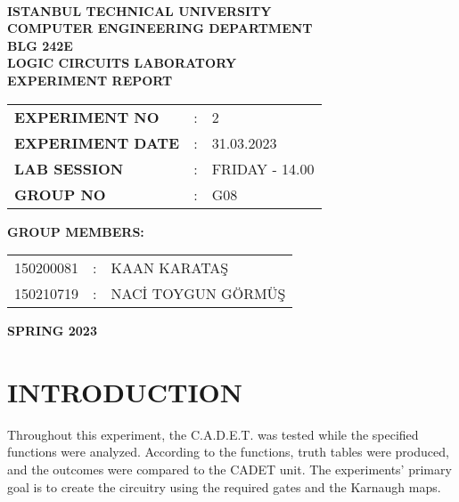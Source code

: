 \documentclass[pdftex,12pt,a4paper]{article}
\begin{document}
\begin{titlepage}
\begin{center}
\textbf{}\\
\textbf{\Large{ISTANBUL TECHNICAL UNIVERSITY}}\\
\vspace{0.5cm}
\textbf{\Large{COMPUTER ENGINEERING DEPARTMENT}}\\
\vspace{2cm}
\textbf{\Large{BLG 242E\\ LOGIC CIRCUITS LABORATORY\\ EXPERIMENT REPORT}}\\
\vspace{2.8cm}
\begin{table}[ht]
\centering
\Large{
\begin{tabular}{lcl}
\textbf{EXPERIMENT NO}  & : & 2 \\
\textbf{EXPERIMENT DATE}  & : & 31.03.2023 \\
\textbf{LAB SESSION}  & : & FRIDAY - 14.00 \\
\textbf{GROUP NO}  & : & G08 \\
\end{tabular}}\end{table}\vspace{1cm}
\textbf{\Large{GROUP MEMBERS:}}\\
\begin{table}[ht]\centering\Large{
\begin{tabular}{rcl}
150200081  & : & KAAN KARATAŞ \\
150210719  & : & NACİ TOYGUN GÖRMÜŞ \\
\end{tabular}}
\end{table}
\vspace{2.8cm}
\textbf{\Large{SPRING 2023}}
\end{center}
\end{titlepage}
\thispagestyle{empty}

\setcounter{tocdepth}{4}
\tableofcontents
\clearpage
\setcounter{page}{1}
\section{INTRODUCTION}
Throughout this experiment, the C.A.D.E.T. was tested while the specified functions were analyzed. According to the functions, truth tables were produced, and the outcomes were compared to the CADET unit. The experiments' primary goal is to create the circuitry using the required gates and the Karnaugh maps.
\end{document}
